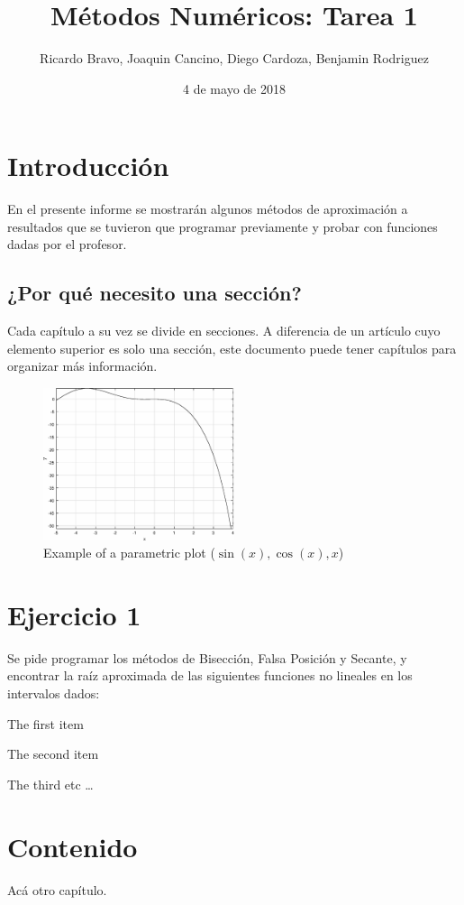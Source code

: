\documentclass{udpreport}
\title{Métodos Numéricos: Tarea 1}
\author{Ricardo Bravo, Joaquin Cancino, Diego Cardoza, Benjamin Rodriguez}
\date{4 de mayo de 2018}
\begin{document}
\maketitle

\tableofcontents
\listoffigures


\chapter{Introducción}
En el presente informe se mostrarán algunos métodos de aproximación a resultados que se tuvieron que programar previamente y probar con funciones dadas por el profesor. 



\section{¿Por qué necesito una sección?}

Cada capítulo a su vez se divide en secciones. A diferencia de un artículo cuyo elemento superior es solo una sección, este documento puede tener capítulos para organizar más información.


\begin{figure}[h]
\centering
\includegraphics[width=0.5\textwidth]{graficos/PuntoFijo[-5,4].eps}
\caption{Example of a parametric plot ($\sin (x), \cos(x), x$)}
\end{figure}



\chapter{Ejercicio 1}

Se pide programar los métodos de Bisección, Falsa Posición y Secante, y encontrar la raíz aproximada de las siguientes funciones no lineales en los intervalos dados:

\begin{enumarate}  
\item The first item 
\item The second item 
\item The third etc \ldots 
\end{enumarate}

\chapter{Contenido}

Acá otro capítulo.
\end{document}
